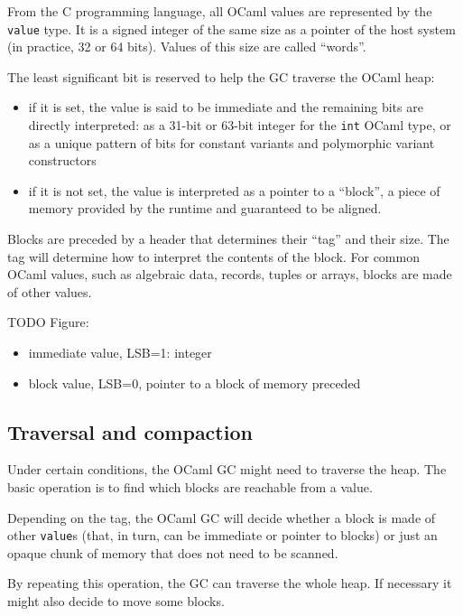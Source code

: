 \documentclass[a4paper]{easychair}
\begin{document}
From the C programming language, all OCaml values are represented by the
\texttt{value} type. It is a signed integer of the same size as a
pointer of the host system (in practice, 32 or 64 bits). Values of this
size are called ``words''.

The least significant bit is reserved to help the GC traverse the OCaml
heap:

\begin{itemize}
\tightlist
\item
  if it is set, the value is said to be immediate and the remaining bits
  are directly interpreted: as a 31-bit or 63-bit integer for the
  \texttt{int} OCaml type, or as a unique pattern of bits for constant
  variants and polymorphic variant constructors
\item
  if it is not set, the value is interpreted as a pointer to a
  ``block'', a piece of memory provided by the runtime and guaranteed to
  be aligned.
\end{itemize}

Blocks are preceded by a header that determines their ``tag'' and their
size. The tag will determine how to interpret the contents of the block.
For common OCaml values, such as algebraic data, records, tuples or
arrays, blocks are made of other values.

TODO Figure:

\begin{itemize}
\tightlist
\item
  immediate value, LSB=1: integer
\item
  block value, LSB=0, pointer to a block of memory preceded
\end{itemize}

\hypertarget{traversal-and-compaction}{%
\subsection{Traversal and compaction}\label{traversal-and-compaction}}

Under certain conditions, the OCaml GC might need to traverse the heap.
The basic operation is to find which blocks are reachable from a value.

Depending on the tag, the OCaml GC will decide whether a block is made
of other \texttt{value}s (that, in turn, can be immediate or pointer to
blocks) or just an opaque chunk of memory that does not need to be
scanned.

By repeating this operation, the GC can traverse the whole heap. If
necessary it might also decide to move some blocks.
\end{document}
